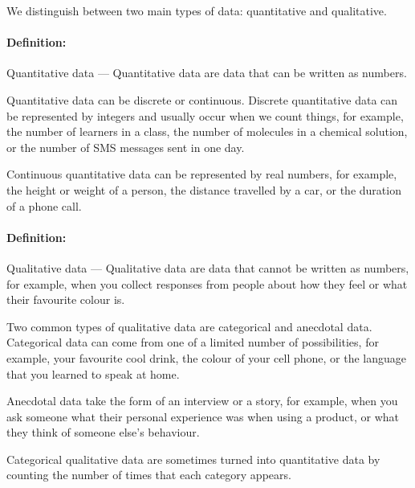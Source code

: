 \documentclass[a4paper,11pt]{report}
\def\Definition#1#2{\paragraph{Definition:} #1 --- #2}
\begin{document}
We distinguish between two main types of data: quantitative and
qualitative.

\Definition{Quantitative data}{Quantitative data are data that can be
  written as numbers.}

Quantitative data can be discrete or continuous. Discrete quantitative
data can be represented by integers and usually occur when we count
things, for example, the number of learners in a class, the number of
molecules in a chemical solution, or the number of SMS messages sent
in one day.

Continuous quantitative data can be represented by real numbers, for
example, the height or weight of a person, the distance travelled by a
car, or the duration of a phone call.

\Definition{Qualitative data}{Qualitative data are data that cannot be
  written as numbers, for example, when you collect responses from
  people about how they feel or what their favourite colour is.}

Two common types of qualitative data are categorical and anecdotal
data. Categorical data can come from one of a limited number of
possibilities, for example, your favourite cool drink, the colour of
your cell phone, or the language that you learned to speak at home.

Anecdotal data take the form of an interview or a story, for example,
when you ask someone what their personal experience was when using a
product, or what they think of someone else's behaviour.

Categorical qualitative data are sometimes turned into quantitative
data by counting the number of times that each category appears.
\end{document}
